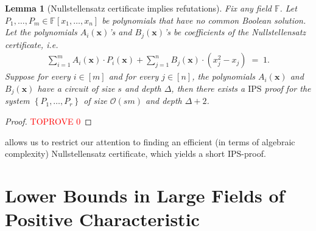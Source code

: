 \documentclass[11pt]{article}
\newtheorem{lemma}[theorem]{Lemma}
\newcommand{\bigO}{\mathcal{O}}
\newcommand{\set}[1]{\left\{ #1 \right\}}
\newcommand{\F}{\mathbb{F}}
\newcommand{\IPS}{\mathrm{IPS}}
\begin{document}
\begin{lemma}[Nullstellensatz certificate implies refutations]\label{lemma:nullstellensatz-refutations}
Fix any field $\F$. Let $P_{1},\ldots,P_{m} \in \F[x_{1},\ldots,x_{n}]$ be polynomials that have no common Boolean solution. Let the polynomials $A_{i}(\mathbf{x})$'s and $B_{j}(\mathbf{x})$'s be coefficients of the Nullstellensatz certificate, i.e.
\begin{align*}
    \sum_{i=1}^{m} A_{i}(\mathbf{x}) \cdot P_{i}(\mathbf{x}) + \sum_{j=1}^{n} B_{j}(\mathbf{x}) \cdot (x_{j}^{2} - x_{j}) \; = \; 1.
\end{align*}
Suppose for every $i \in [m]$ and for every $j \in [n]$, the polynomials $A_{i}(\mathbf{x})$ and $B_{j}(\mathbf{x})$ have a circuit of size $s$ and depth $\Delta$, then there exists a $\IPS$ proof for the system $\set{P_{1},\ldots,P_{r}}$ of size $\bigO(sm)$ and depth $\Delta+2$.
\end{lemma}
\begin{proof}\textcolor{red}{TOPROVE 0}\end{proof} 
 allows us to restrict our attention to finding an efficient (in terms of algebraic complexity) Nullstellensatz certificate, which yields a short $\IPS$-proof.




\newcommand{\Coeff}{\ensuremath{\operatorname{Coeff}}}
\newcommand{\bfCoeff}{\ensuremath{\operatorname{\mathbf{Coeff}}}}
\newcommand{\Eval}{\ensuremath{\operatorname{Eval}}}
\newcommand{\bfEval}{\ensuremath{\operatorname{\mathbf{Eval}}}}
\newcommand{\bfalpha}{\ensuremath{\boldsymbol{\alpha}}}
\newcommand{\bfw}{\ensuremath{\mathbf{w}}}
\newcommand{\Aw}{\ensuremath{A_\bfw}}
\newcommand{\Bw}{\ensuremath{B_\bfw}}
\renewcommand{\char}{\ensuremath{\operatorname{char}}}
\newcommand{\bbF}{\ensuremath{\F}}
\newcommand{\ksw}{\ensuremath{\operatorname{ks}_{\bfw}}}
\newcommand{\kswnew}[1]{\ensuremath{\operatorname{ks}_{\bfw,#1}}}
\section{Lower Bounds in Large Fields of Positive Characteristic}
\end{document}
